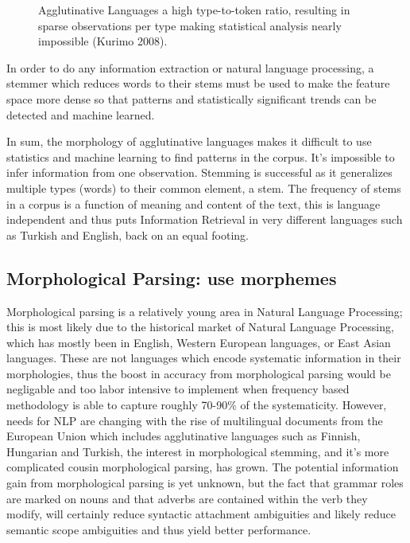 \documentclass[runningheads,a4paper]{llncs}
\begin{document}
\begin{figure}[thb]
	\caption{Agglutinative Languages a high type-to-token ratio, resulting in sparse observations per type making statistical analysis nearly impossible (Kurimo 2008).}
	\label{fig:typetokenratios}
\end{figure}

In order to do any information extraction or natural language processing, a stemmer which reduces words to their stems must be used to make the feature space more dense so that patterns and statistically significant trends can be detected and machine learned.

In sum, the morphology of agglutinative languages makes it difficult to use statistics and machine learning to find patterns in the corpus. It's impossible to infer information from one observation. Stemming is successful as it generalizes multiple types (words) to their common  element, a stem. The frequency of stems in a corpus is a function of meaning and content of the text, this is language independent and thus puts Information Retrieval in very different languages such as Turkish and English, back on an equal footing. 

\subsection{Morphological Parsing: use morphemes}
\label{parsing}
Morphological parsing is a relatively young area in Natural Language Processing; this is most likely due to the historical market of Natural Language Processing, which has mostly been in English, Western European languages, or East Asian languages. These are not languages which encode systematic information in their morphologies, thus the boost in accuracy from morphological parsing would be negligable and too labor intensive to implement when frequency based methodology is able to capture roughly 70-90\% of the systematicity. However, needs for NLP are changing with the rise of multilingual documents from the European Union which includes agglutinative languages such as Finnish, Hungarian and Turkish, the interest in morphological stemming, and it's more complicated cousin morphological parsing, has grown. The potential information gain from morphological parsing is yet unknown, but the fact that grammar roles are marked on nouns and that adverbs are contained within the verb they modify, will certainly reduce syntactic attachment ambiguities and likely reduce semantic scope ambiguities and thus yield better performance. 
\end{document}
